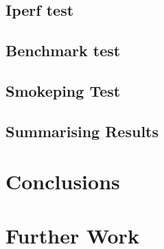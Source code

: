 \documentclass[letter, 11pt]{article}
\begin{document}
\subsection{Iperf test}


\subsection{Benchmark test}


\subsection{Smokeping Test}


\subsection{Summarising Results}

\newpage
\section{Conclusions}

\newpage
\section{Further Work}

\newpage
{}
\end{document}
